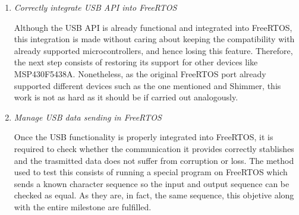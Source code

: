\begin{enumerate}
			\item \emph{Correctly integrate USB API into FreeRTOS}\\

				\begin{comment}
				Once it's done our preocupation was how to order all this files in a correct way, because our
				free RTOS was a multiplatform SO that must work in MSP430 5438A, Shimmer, and now, the new MSP430
				6638 where take place this develope. In the first port where the multiplatform ability of
				FreeRTOS was not a problem we lost this funcionality. This separation of tasks help pretty much
				in focus the first steps in this milestone. This new functionality have to be included just in
				the supported platform, the MSP430 6638, without affect the other ones as before. Using the
				preciding generalization needed to cohexists Shimmer and MSP430 5438A as a guide this port was
				not too traumatic.
				\end{comment}
				Although the USB API is already functional and integrated into FreeRTOS, this integration is made
				without caring about keeping the compatibility with already supported microcontrollers, and hence
				losing this feature. Therefore, the next step consists of restoring its support for other devices
				like MSP430F5438A. Nonetheless, as the original FreeRTOS port already supported different devices
				such as the one mentioned and Shimmer\texttrademark, this work is not as hard as it should be if
				carried out analogously.

			\item \emph{Manage USB data sending in FreeRTOS}\\

				\begin{comment}
				Finally with the USB API correctly integrate and its functionality validated, the implementacion
				of a closer program to the expected funcitionality of the device was attempted, sending a already
				know character secuence of 1 byte long, and checking that it's been recived in the other side.
				This test was satisfactory and the milestone was finally achieved.
				\end{comment}

				Once the USB functionality is properly integrated into FreeRTOS, it is required to check whether
				the communication it provides correctly stablishes and the trasmitted data does not suffer from
				corruption or loss. The method used to test this consists of running a special program on FreeRTOS
				which sends a known character sequence so the input and output sequence can be checked as equal.
				As they are, in fact, the same sequence, this objetive along with the entire milestone are
				fulfilled.
		\end{enumerate}

